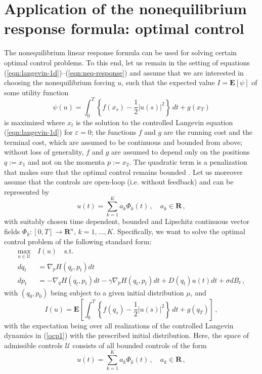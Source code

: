 \documentclass[]{tMPH2e}
\newcommand{\R}{{\mathbf R}}
\newcommand{\eps}{\varepsilon}
\newcommand{\cU}{\mathcal U}
\newcommand{\bE}{{\mathbf E}}
\begin{document}
\section{Application of the nonequilibrium response formula: optimal control}

The nonequilibrium linear response formula can be used for solving certain optimal control problems. To this end, let us remain in the setting of equations (\ref{eqn:langevin-1d})--(\ref{eqn:neq-response}) and assume that we are interested in choosing the nonequilibrium forcing $u$, such that the expected value $I=\bE[\psi]$ of some utility function 
\[
\psi(u) = \int_{0}^{T}\left\{f(x_{s}) - \frac{1}{2}|u(s)|^{2}\right\}\,dt + g(x_{T}) 
\]
is maximized where $x_{t}$ is the solution to the controlled Langevin equation (\ref{eqn:langevin-1d}) for $\eps=0$; the functions $f$ and $g$ are the running cost and the terminal cost, which are assumed to be continuous and bounded from above; without loss of generality, $f$ and $g$ are assumed to depend only on the positions $q:=x_{1}$ and not on the momenta $p:=x_{2}$. The quadratic term is a penalization that makes sure that the optimal control remains bounded \cite{schuette2012,hartmann2012}. Let us moreover assume that the controls are open-loop (i.e. without feedback) and can be represented by 
\[
u(t) = \sum_{k=1}^K a_k \Phi_k(t)\,,\quad a_{k}\in \R\,,
\]
with suitably chosen time dependent, bounded and Lipschitz continuous vector fields $\Phi_k\colon[0,T]\to\R^{n}$, $k=1,\ldots,K$. %
Specifically, we want to solve the optimal control problem of the following standard form: 
\begin{equation}\label{ocp1}
\begin{aligned}
 \max_{u\in\cU} \,& I(u)\quad \textrm{s.t.}\\
dq_t & =  \nabla_p H(q_t,p_t)dt\\
dp_t & =  -\nabla_q H(q_t,p_t)dt - \gamma \nabla_p H(q_t,p_t)dt + D(q_t)u(t) dt+\sigma dB_t\,,
\end{aligned}
\end{equation}
with $(q_0, p_0)$ being subject to a given initial distribution $\mu$, and
\begin{equation}\label{ocp2}
I(u) = \bE\left[\int_{0}^{T}\left\{f(q_{s}) - \frac{1}{2}|u(s)|^{2}\right\}\,dt + g(q_{T}) \right]\,,
\end{equation}
with the expectation being over all realizations of the controlled Langevin dynamics in (\ref{ocp1}) with the prescribed initial distribution. Here, the space of admissible controls $\cU$ consists of all bounded controls of the form 
\begin{equation}\label{admissible}
u(t) = \sum_{k=1}^K a_k \Phi_k(t)\,,\quad a_{k}\in \R\,,
\end{equation}
\end{document}

